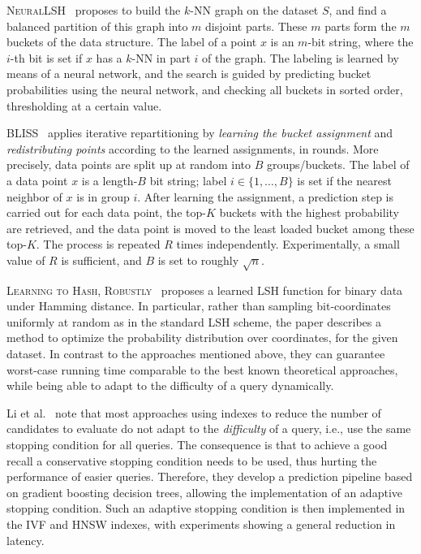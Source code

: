\documentclass[11pt]{article}
\begin{document}
\textsc{NeuralLSH}~\cite{DBLP:conf/iclr/DongIRW20} proposes to build the
$k$-NN graph on the dataset $S$, and find a balanced partition of this
graph into $m$ disjoint parts. These $m$ parts form the $m$ buckets of
the data structure. The label of a point $x$ is an $m$-bit string, where
the $i$-th bit is set if $x$ has a $k$-NN in part $i$ of the graph. The labeling
is learned by means of a neural network, and the search is guided by
predicting bucket probabilities using the neural network, and checking
all buckets in sorted order, thresholding at a certain value.

\textsc{BLISS}~\cite{DBLP:conf/kdd/GuptaMSS22} applies iterative
repartitioning by \emph{learning the bucket assignment} and
\emph{redistributing points} according to the learned assignments, in rounds. More
precisely, data points are split up at random into $B$ groups/buckets.
The label of a data point $x$ is a length-$B$ bit string; label $i \in
	\{1, \ldots, B\}$ is set if the nearest neighbor of $x$ is in group $i$.
After learning the assignment, a prediction step is carried out for each
data point, the top-$K$ buckets with the highest probability are
retrieved, and the data point is moved to the least loaded bucket among
these top-$K$. The process is repeated $R$ times independently.
Experimentally, a small value of $R$ is sufficient, and $B$ is set to
roughly $\sqrt{n}$.


\textsc{Learning to Hash, Robustly}~\cite{DBLP:conf/icml/AndoniB22} proposes a
learned LSH function for binary data under Hamming distance. In particular,
rather than sampling bit-coordinates uniformly at random as in the standard LSH
scheme, the paper describes a method to optimize the probability distribution
over coordinates, for the given dataset. In contrast to the approaches
mentioned above, they can guarantee worst-case running time comparable to the
best known theoretical approaches, while being able to adapt to the difficulty
of a query dynamically.

Li et al.~\cite{DBLP:conf/sigmod/LiZAH20} note that most approaches using
indexes to reduce the number of candidates to evaluate do not adapt to the
\emph{difficulty} of a query, i.e., use the same stopping condition for all
queries. The consequence is that to achieve a good recall a conservative
stopping condition needs to be used, thus hurting the performance of easier
queries. Therefore, they develop a prediction pipeline based on gradient
boosting decision trees, allowing the implementation of an adaptive stopping
condition. Such an adaptive stopping condition is then implemented in the IVF and
HNSW indexes, with experiments showing a general reduction in latency.
\end{document}
